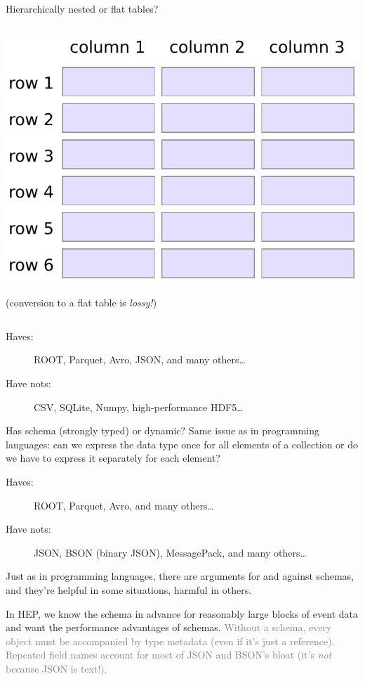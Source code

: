 \documentclass[aspectratio=169]{beamer}
\begin{document}
\begin{frame}{Hierarchically nested or flat tables?}
\begin{columns}[t]
\begin{center}
\vspace{0.2 cm}
\includegraphics[width=0.7\linewidth]{table-structure.pdf}

\small (conversion to a flat table is {\it lossy!})

\end{center}
\end{columns}

\vspace{0.25 cm}

\begin{description}
\item[Haves:] ROOT, Parquet, Avro, JSON, and many others\ldots
\item[Have nots:] CSV, SQLite, Numpy, high-performance HDF5\ldots
\end{description}
\end{frame}

\begin{frame}{Has schema (strongly typed) or dynamic?}
\vspace{0.5 cm}
Same issue as in programming languages: can we express the data type once for all elements of a collection or do we have to express it separately for each element?

\vfill

\begin{description}
\item[Haves:] ROOT, Parquet, Avro, and many others\ldots
\item[Have nots:] JSON, BSON (binary JSON), MessagePack, and many others\ldots
\end{description}

\vfill

Just as in programming languages, there are arguments for and against schemas, and they're helpful in some situations, harmful in others.

\vfill

In HEP, we know the schema in advance for reasonably large blocks of event data and want the performance advantages of schemas. \textcolor{gray}{Without a schema, every object must be accompanied by type metadata (even if it's just a reference). Repeated field names account for most of JSON and BSON's bloat (it's {\it not} because JSON is text!).}
\end{frame}
\end{document}
